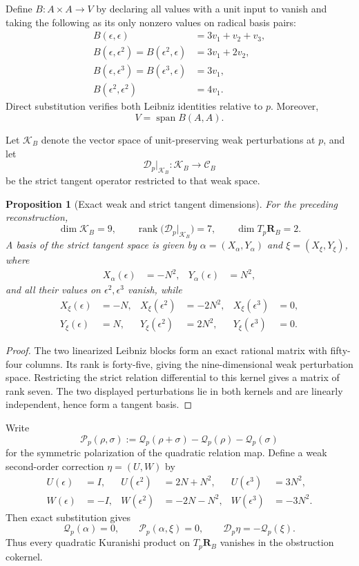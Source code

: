 \documentclass[11pt]{amsart}
\newtheorem{proposition}[theorem]{Proposition}
\newcommand{\Span}{\operatorname{span}}
\newcommand{\rank}{\operatorname{rank}}
\newcommand{\cD}{\mathscr D}
\newcommand{\cQ}{\mathscr Q}
\newcommand{\cP}{\mathscr P}
\newcommand{\Rel}{\mathscr C}
\begin{document}
Define $B:A\times A\to V$ by declaring all values with a unit input to vanish and taking the following as its only nonzero values on radical basis pairs:
\begin{align*}
B(\epsilon,\epsilon)&=3v_1+v_2+v_3,\\
B(\epsilon,\epsilon^2)=B(\epsilon^2,\epsilon)&=3v_1+2v_2,\\
B(\epsilon,\epsilon^3)=B(\epsilon^3,\epsilon)&=3v_1,\\
B(\epsilon^2,\epsilon^2)&=4v_1.
\end{align*}
Direct substitution verifies both Leibniz identities relative to $p$.  Moreover,
\[
V=\Span B(A,A).
\]

Let $\mathcal K_B$ denote the vector space of unit-preserving weak perturbations at $p$, and let
\[
\cD_p\big|_{\mathcal K_B}:\mathcal K_B\longrightarrow\Rel_B
\]
be the strict tangent operator restricted to that weak space.

\begin{proposition}[Exact weak and strict tangent dimensions]\label{prop:cubic-tangent}
For the preceding reconstruction,
\[
\dim\mathcal K_B=9,
\qquad
\rank\bigl(\cD_p|_{\mathcal K_B}\bigr)=7,
\qquad
\dim T_p\mathbf R_B=2.
\]
A basis of the strict tangent space is given by $\alpha=(X_\alpha,Y_\alpha)$ and $\xi=(X_\xi,Y_\xi)$, where
\begin{align*}
X_\alpha(\epsilon)&=-N^2,
&Y_\alpha(\epsilon)&=N^2,
\end{align*}
and all their values on $\epsilon^2,\epsilon^3$ vanish, while
\begin{align*}
X_\xi(\epsilon)&=-N,
&X_\xi(\epsilon^2)&=-2N^2,
&X_\xi(\epsilon^3)&=0,\\
Y_\xi(\epsilon)&=N,
&Y_\xi(\epsilon^2)&=2N^2,
&Y_\xi(\epsilon^3)&=0.
\end{align*}
\end{proposition}

\begin{proof}
The two linearized Leibniz blocks form an exact rational matrix with fifty-four columns.  Its rank is forty-five, giving the nine-dimensional weak perturbation space.  Restricting the strict relation differential to this kernel gives a matrix of rank seven.  The two displayed perturbations lie in both kernels and are linearly independent, hence form a tangent basis.
\end{proof}

Write
\[
\cP_p(\rho,\sigma)
:=
\cQ_p(\rho+\sigma)-\cQ_p(\rho)-\cQ_p(\sigma)
\]
for the symmetric polarization of the quadratic relation map.  Define a weak second-order correction $\eta=(U,W)$ by
\begin{align*}
U(\epsilon)&=I,
&U(\epsilon^2)&=2N+N^2,
&U(\epsilon^3)&=3N^2,\\
W(\epsilon)&=-I,
&W(\epsilon^2)&=-2N-N^2,
&W(\epsilon^3)&=-3N^2.
\end{align*}
Then exact substitution gives
\begin{equation}\label{eq:cubic-second-lift}
\cQ_p(\alpha)=0,
\qquad
\cP_p(\alpha,\xi)=0,
\qquad
\cD_p\eta=-\cQ_p(\xi).
\end{equation}
Thus every quadratic Kuranishi product on $T_p\mathbf R_B$ vanishes in the obstruction cokernel.
\end{document}
